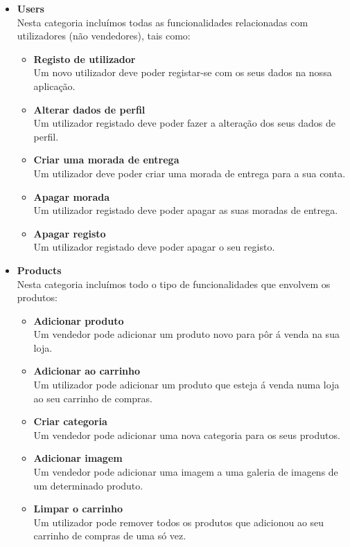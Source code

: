 \begin{itemize}

  \item \textbf{Users} \\
  Nesta categoria incluímos todas as funcionalidades relacionadas com utilizadores (não vendedores), tais como:
  \begin{itemize}
    \item \textbf{Registo de utilizador}\\ Um novo utilizador deve poder registar-se com os seus dados na nossa aplicação.
    \item \textbf{Alterar dados de perfil}\\ Um utilizador registado deve poder fazer a alteração dos seus dados de perfil.
    \item \textbf{Criar uma morada de entrega}\\ Um utilizador deve poder criar uma morada de entrega para a sua conta.
    \item \textbf{Apagar morada}\\ Um utilizador registado deve poder apagar as suas moradas de entrega.
    \item \textbf{Apagar registo}\\ Um utilizador registado deve poder apagar o seu registo.
  \end{itemize}

  \vspace{6pt}

  \item \textbf{Products} \\
  Nesta categoria incluímos todo o tipo de funcionalidades que envolvem os produtos:
  \begin{itemize}
      \item \textbf{Adicionar produto}\\ Um vendedor pode adicionar um produto novo para pôr á venda na sua loja.
      \item \textbf{Adicionar ao carrinho}\\ Um utilizador pode adicionar um produto que esteja á venda numa loja ao seu carrinho de compras.
      \item \textbf{Criar categoria}\\ Um vendedor pode adicionar uma nova categoria para os seus produtos.
      \item \textbf{Adicionar imagem}\\ Um vendedor pode adicionar uma imagem a uma galeria de imagens de um determinado produto.
      \item \textbf{Limpar o carrinho}\\ Um utilizador pode remover todos os produtos que adicionou ao seu carrinho de compras de uma só vez.
  \end{itemize}


\end{itemize}
